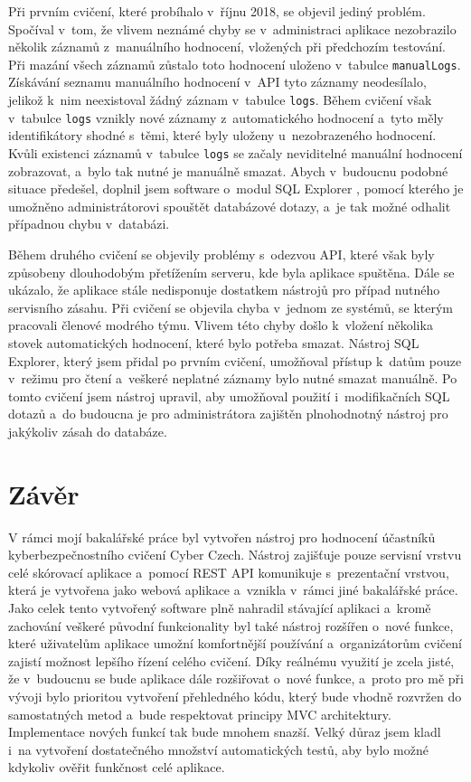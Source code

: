 \documentclass[
  digital,
  twoside,
  table, 
  nolof, 
  nolot
]{fithesis3}
\begin{document}
Při prvním cvičení, které probíhalo v~říjnu 2018, se objevil jediný problém. Spočíval v~tom, že vlivem neznámé chyby se v~administraci aplikace nezobrazilo několik záznamů z~manuálního hodnocení, vložených při předchozím testování. Při mazání všech záznamů zůstalo toto hodnocení uloženo v~tabulce \texttt{manualLogs}. Získávání seznamu manuálního hodnocení v~API tyto záznamy neodesílalo, jelikož k~nim neexistoval žádný záznam v~tabulce \texttt{logs}. Během cvičení však v~tabulce \texttt{logs} vznikly nové záznamy z~automatického hodnocení a~tyto měly identifikátory shodné s~těmi, které byly uloženy u~nezobrazeného hodnocení. Kvůli existenci záznamů v~tabulce \texttt{logs} se začaly neviditelné manuální hodnocení zobrazovat, a~bylo tak nutné je manuálně smazat. Abych v~budoucnu podobné situace předešel, doplnil jsem software o~modul SQL Explorer \cite{sqlexplorer}, pomocí kterého je umožněno administrátorovi spouštět databázové dotazy, a~je tak možné odhalit případnou chybu v~databázi.

Během druhého cvičení se objevily problémy s~odezvou API, které však byly způsobeny dlouhodobým přetížením serveru, kde byla aplikace spuštěna. Dále se ukázalo, že aplikace stále nedisponuje dostatkem nástrojů pro případ nutného servisního zásahu. Při cvičení se objevila chyba v~jednom ze systémů, se kterým pracovali členové modrého týmu. Vlivem této chyby došlo k~vložení několika stovek automatických hodnocení, které bylo potřeba smazat. Nástroj SQL Explorer, který jsem přidal po prvním cvičení, umožňoval přístup k~datům pouze v~režimu pro čtení a~veškeré neplatné záznamy bylo nutné smazat manuálně. Po tomto cvičení jsem nástroj upravil, aby umožňoval použití i~modifikačních SQL dotazů a~do budoucna je pro administrátora zajištěn plnohodnotný nástroj pro jakýkoliv zásah do databáze.

\chapter{Závěr}
\label{end}

V rámci mojí bakalářské práce byl vytvořen nástroj pro hodnocení účastníků kyberbezpečnostního cvičení Cyber Czech. Nástroj zajišťuje pouze servisní vrstvu celé skórovací aplikace a~pomocí REST API komunikuje s~prezentační vrstvou, která je vytvořena jako webová aplikace a~vznikla v~rámci jiné bakalářské práce. Jako celek tento vytvořený software plně nahradil stávající aplikaci a~kromě zachování veškeré původní funkcionality byl také nástroj rozšířen o~nové funkce, které uživatelům aplikace umožní komfortnější používání a~organizátorům cvičení zajistí možnost lepšího řízení celého cvičení. Díky reálnému využití je zcela jisté, že v~budoucnu se bude aplikace dále rozšiřovat o~nové funkce, a~proto pro mě při vývoji bylo prioritou vytvoření přehledného kódu, který bude vhodně rozvržen do samostatných metod a~bude respektovat principy MVC architektury. Implementace nových funkcí tak bude mnohem snazší. Velký důraz jsem kladl i~na vytvoření dostatečného množství automatických testů, aby bylo možné kdykoliv ověřit funkčnost celé aplikace.
\end{document}
